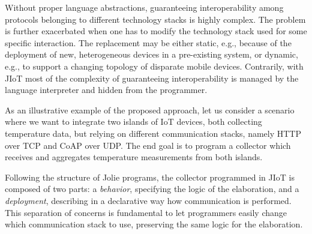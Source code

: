 Without proper language abstractions, guaranteeing interoperability among
protocols belonging to different technology stacks is highly complex. The
problem is further exacerbated when one has to modify the technology stack used
for some specific interaction. The replacement may be either static, e.g.,
because of the deployment of new, heterogeneous devices in a pre-existing
system, or dynamic, e.g., to support a changing topology of disparate mobile
devices. Contrarily, with JIoT most of the complexity of guaranteeing
interoperability is managed by the language interpreter and hidden from the
programmer.

As an illustrative example of the proposed approach, let us consider a scenario
where we want to integrate two islands of IoT devices, both collecting
temperature data, but relying on different communication stacks, namely HTTP
over TCP and CoAP over UDP.
%
The end goal is to program a collector which receives and aggregates temperature
measurements from both islands.

Following the structure of Jolie programs, the collector programmed in JIoT is
composed of two parts: a \emph{behavior}, specifying the logic of the
elaboration, and a \emph{deployment}, describing in a declarative way how
communication is performed. This separation of concerns is fundamental to let
programmers easily change which communication stack to use, preserving the same
logic for the elaboration.

